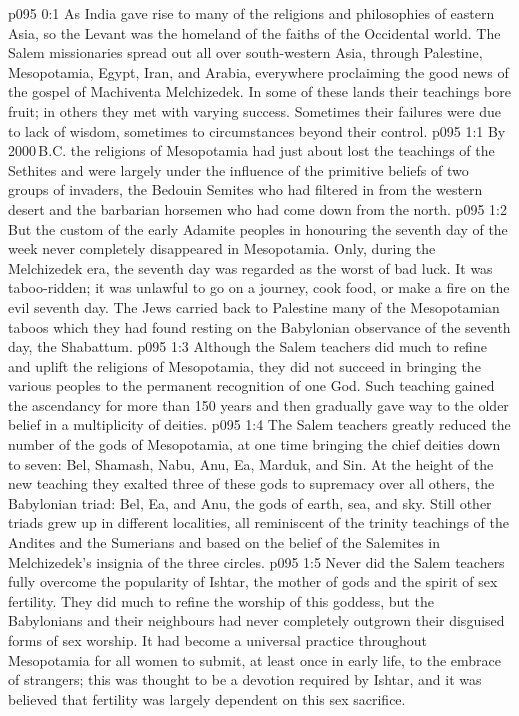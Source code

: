 \author{Melchizedek}
\vs p095 0:1 As India gave rise to many of the religions and philosophies of eastern Asia, so the Levant was the homeland of the faiths of the Occidental world. The Salem missionaries spread out all over south\hyp{}western Asia, through Palestine, Mesopotamia, Egypt, Iran, and Arabia, everywhere proclaiming the good news of the gospel of Machiventa Melchizedek. In some of these lands their teachings bore fruit; in others they met with varying success. Sometimes their failures were due to lack of wisdom, sometimes to circumstances beyond their control.
\vs p095 1:1 By 2000\,B.C. the religions of Mesopotamia had just about lost the teachings of the Sethites and were largely under the influence of the primitive beliefs of two groups of invaders, the Bedouin Semites who had filtered in from the western desert and the barbarian horsemen who had come down from the north.
\vs p095 1:2 But the custom of the early Adamite peoples in honouring the seventh day of the week never completely disappeared in Mesopotamia. Only, during the Melchizedek era, the seventh day was regarded as the worst of bad luck. It was taboo\hyp{}ridden; it was unlawful to go on a journey, cook food, or make a fire on the evil seventh day. The Jews carried back to Palestine many of the Mesopotamian taboos which they had found resting on the Babylonian observance of the seventh day, the Shabattum.
\vs p095 1:3 Although the Salem teachers did much to refine and uplift the religions of Mesopotamia, they did not succeed in bringing the various peoples to the permanent recognition of one God. Such teaching gained the ascendancy for more than 150 years and then gradually gave way to the older belief in a multiplicity of deities.
\vs p095 1:4 The Salem teachers greatly reduced the number of the gods of Mesopotamia, at one time bringing the chief deities down to seven: Bel, Shamash, Nabu, Anu, Ea, Marduk, and Sin. At the height of the new teaching they exalted three of these gods to supremacy over all others, the Babylonian triad: Bel, Ea, and Anu, the gods of earth, sea, and sky. Still other triads grew up in different localities, all reminiscent of the trinity teachings of the Andites and the Sumerians and based on the belief of the Salemites in Melchizedek’s insignia of the three circles.
\vs p095 1:5 Never did the Salem teachers fully overcome the popularity of Ishtar, the mother of gods and the spirit of sex fertility. They did much to refine the worship of this goddess, but the Babylonians and their neighbours had never completely outgrown their disguised forms of sex worship. It had become a universal practice throughout Mesopotamia for all women to submit, at least once in early life, to the embrace of strangers; this was thought to be a devotion required by Ishtar, and it was believed that fertility was largely dependent on this sex sacrifice.
